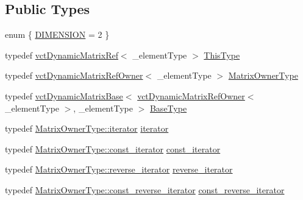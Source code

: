 \subsection*{Public Types}
\begin{DoxyCompactItemize}
\item 
enum \{ \hyperlink{group__cisst_vector_gga296ccb28efb27cc7c51864f9e81b77eca26570951ef99650f548cdec008ae4444}{D\+I\+M\+E\+N\+S\+I\+O\+N} = 2
 \}
\item 
typedef \hyperlink{classvct_dynamic_matrix_ref}{vct\+Dynamic\+Matrix\+Ref}$<$ \+\_\+element\+Type $>$ \hyperlink{classvct_dynamic_matrix_ref_ac01200e3df0afe95f5d3948da84c8551}{This\+Type}
\item 
typedef \hyperlink{classvct_dynamic_matrix_ref_owner}{vct\+Dynamic\+Matrix\+Ref\+Owner}$<$ \+\_\+element\+Type $>$ \hyperlink{classvct_dynamic_matrix_ref_a24cb066b24bdc74c68af35e7c88f8a07}{Matrix\+Owner\+Type}
\item 
typedef \hyperlink{classvct_dynamic_matrix_base}{vct\+Dynamic\+Matrix\+Base}$<$ \hyperlink{classvct_dynamic_matrix_ref_owner}{vct\+Dynamic\+Matrix\+Ref\+Owner}$<$ \+\_\+element\+Type $>$, \+\_\+element\+Type $>$ \hyperlink{classvct_dynamic_matrix_ref_a043cfda592e3e7fbca034c09aed3438b}{Base\+Type}
\item 
typedef \hyperlink{classvct_dynamic_matrix_ref_owner_aaf9f6aaf86c05aec0bcd354d40c11863}{Matrix\+Owner\+Type\+::iterator} \hyperlink{classvct_dynamic_matrix_ref_a96cb0ad0104a135e19f1e39567a16ef2}{iterator}
\item 
typedef \hyperlink{classvct_dynamic_matrix_ref_owner_a7a8df19473cc2e95e25c4d1bf4bacbe4}{Matrix\+Owner\+Type\+::const\+\_\+iterator} \hyperlink{classvct_dynamic_matrix_ref_a6a0340b4b42746edc27c8220cf44afd8}{const\+\_\+iterator}
\item 
typedef \hyperlink{classvct_dynamic_matrix_ref_owner_a133b22e9f6b4e7a20998ad3db72ed6c3}{Matrix\+Owner\+Type\+::reverse\+\_\+iterator} \hyperlink{classvct_dynamic_matrix_ref_ad797e9f33fe82864e8df2c8c6a30b383}{reverse\+\_\+iterator}
\item 
typedef \hyperlink{classvct_dynamic_matrix_ref_owner_a50c3b985899b0d6cb2f9fab9f8305207}{Matrix\+Owner\+Type\+::const\+\_\+reverse\+\_\+iterator} \hyperlink{classvct_dynamic_matrix_ref_a6b38953e6bef46b68d3336829873f48e}{const\+\_\+reverse\+\_\+iterator}
\end{DoxyCompactItemize}
